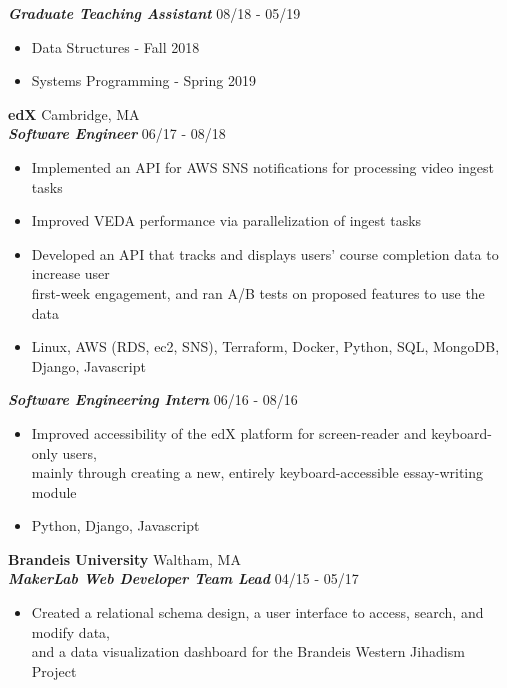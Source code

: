 \documentclass{res}
\begin{document}
\begin{resume}
\textbf{\textit{Graduate Teaching Assistant}}  \hfill 08/18 - 05/19 \\ 
	\begin{itemize}  \itemsep -2pt %
	\item Data Structures - Fall 2018
	\item Systems Programming - Spring 2019
	\end{itemize}

\textbf{edX} \hfill Cambridge, MA \\
\textbf{\textit{Software Engineer}} \hfill 06/17 - 08/18 \\ 
	\begin{itemize}  \itemsep -2pt %
	\item Implemented an API for AWS SNS notifications for processing video ingest tasks
	\item Improved VEDA performance via parallelization of ingest tasks
	\item Developed an API that tracks and displays users' course completion data to increase user \\
		first-week engagement, and ran A/B tests on proposed features to use the data 
	\item Linux, AWS (RDS, ec2, SNS), Terraform, Docker, Python, SQL, MongoDB, Django, Javascript
	\end{itemize}

\textbf{\textit{Software Engineering Intern}} \hfill 06/16 - 08/16 \\
	\begin{itemize}  \itemsep -2pt %
	\item Improved accessibility of the edX platform for screen-reader and keyboard-only users, \\
		mainly through creating a new, entirely keyboard-accessible essay-writing module
	\item Python, Django, Javascript
	\end{itemize}
	

\textbf{Brandeis University} \hfill Waltham, MA\\
\textbf{\textit{MakerLab Web Developer Team Lead}} \hfill 04/15 - 05/17 \\
	\begin{itemize}  \itemsep -2pt %
	\item Created a relational schema design, a user interface to access, search, and modify data, \\
		and a data visualization dashboard for the Brandeis Western Jihadism Project
	\end{itemize}


\end{resume}
\end{document}
